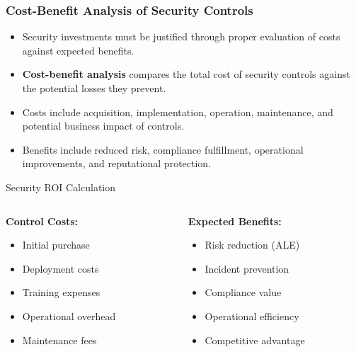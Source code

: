 \documentclass{beamer}
\begin{document}
\begin{frame}
    \frametitle{Cost-Benefit Analysis of Security Controls}
    \begin{itemize}
        \item Security investments must be justified through proper evaluation of costs against expected benefits.
        \item \textbf{Cost-benefit analysis} compares the total cost of security controls against the potential losses they prevent.
        \item Costs include acquisition, implementation, operation, maintenance, and potential business impact of controls.
        \item Benefits include reduced risk, compliance fulfillment, operational improvements, and reputational protection.
    \end{itemize}
    
    \begin{block}{Security ROI Calculation}
        \begin{columns}
            \begin{column}{0.48\textwidth}
                \textbf{Control Costs:}
                \begin{itemize}
                    \item Initial purchase
                    \item Deployment costs
                    \item Training expenses
                    \item Operational overhead
                    \item Maintenance fees
                \end{itemize}
            \end{column}
            \begin{column}{0.48\textwidth}
                \textbf{Expected Benefits:}
                \begin{itemize}
                    \item Risk reduction (ALE)
                    \item Incident prevention
                    \item Compliance value
                    \item Operational efficiency
                    \item Competitive advantage
                \end{itemize}
            \end{column}
        \end{columns}
    \end{block}
\end{frame}
\end{document}
